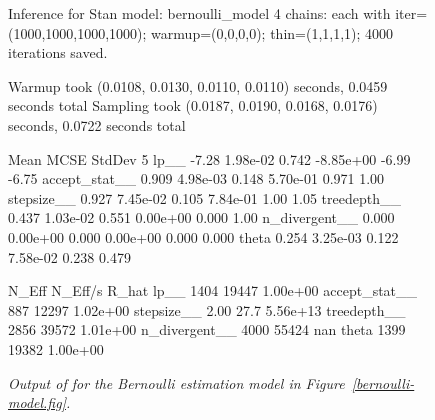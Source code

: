 \documentclass[article]{jss}
\begin{document}
\begin{figure}
\begin{Code}
Inference for Stan model: bernoulli_model
4 chains: each with iter=(1000,1000,1000,1000); warmup=(0,0,0,0); 
                    thin=(1,1,1,1); 4000 iterations saved.

Warmup took (0.0108, 0.0130, 0.0110, 0.0110) seconds, 0.0459 seconds total
Sampling took (0.0187, 0.0190, 0.0168, 0.0176) seconds, 0.0722 seconds total

                 Mean      MCSE  StdDev         5%
lp__            -7.28  1.98e-02   0.742  -8.85e+00  -6.99  -6.75
accept_stat__   0.909  4.98e-03   0.148   5.70e-01  0.971   1.00
stepsize__      0.927  7.45e-02   0.105   7.84e-01   1.00   1.05
treedepth__     0.437  1.03e-02   0.551   0.00e+00  0.000   1.00
n_divergent__   0.000  0.00e+00   0.000   0.00e+00  0.000  0.000
theta           0.254  3.25e-03   0.122   7.58e-02  0.238  0.479

                N_Eff  N_Eff/s     R_hat
lp__             1404    19447  1.00e+00
accept_stat__     887    12297  1.02e+00
stepsize__       2.00     27.7  5.56e+13
treedepth__      2856    39572  1.01e+00
n_divergent__    4000    55424       nan
theta            1399    19382  1.00e+00
\end{Code}
\caption{\it Output of  for the Bernoulli estimation model in
  Figure~\ref{bernoulli-model.fig}.}\label{print-output.fig}
\end{figure}
\end{document}
